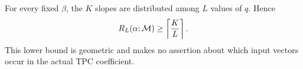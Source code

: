 For every fixed \(\beta\), the \(K\) slopes are distributed among
\(L\) values of \(q\).  Hence
\begin{equation}
 R_L(\alpha;\mathcal M)\ge\left\lceil\frac KL\right\rceil.
 \label{eq:tpc48-load-pigeonhole}
\end{equation}
This lower bound is geometric and makes no assertion about which input
vectors occur in the actual TPC coefficient.
